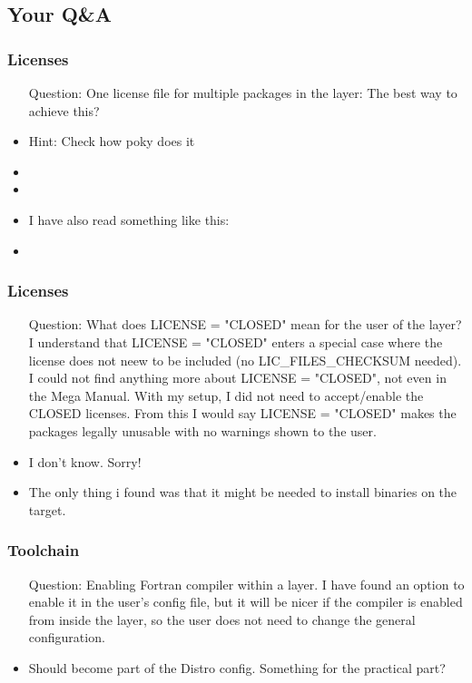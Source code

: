 \subsection{Your Q\&A}

\begin{frame}
\frametitle{Licenses}
   \begin{itemize}
      \item[Question:] One license file for multiple packages in the layer: The best way to achieve this?
      \item Hint: Check how poky does it
      \item {}
      \item {}
      \item I have also read something like this:
      \item {}
   \end{itemize}
\end{frame}

\begin{frame}
\frametitle{Licenses}
  \begin{itemize}
     \item[Question:] What does LICENSE = "CLOSED" mean for the user of the layer?
        I understand that LICENSE = "CLOSED" enters a special case where the
        license does not neew to be included (no LIC\_FILES\_CHECKSUM needed). I
        could not find anything more about LICENSE = "CLOSED", not even in the
        Mega Manual. With my setup, I did not need to accept/enable the CLOSED
        licenses. From this I would say LICENSE = "CLOSED" makes the packages
        legally unusable with no warnings shown to the user.
     \item I don't know. Sorry!
     \item The only thing i found was that it might be needed to install binaries on the target.
  \end{itemize}
\end{frame}

\begin{frame}
\frametitle{Toolchain}
   \begin{itemize}
      \item[Question:] Enabling Fortran compiler within a layer. I have found an option to
        enable it in the user's config file, but it will be nicer if the
        compiler is enabled from inside the layer, so the user does not need
        to change the general configuration.
      \item Should become part of the Distro config. Something for the practical part?
   \end{itemize}
\end{frame}

